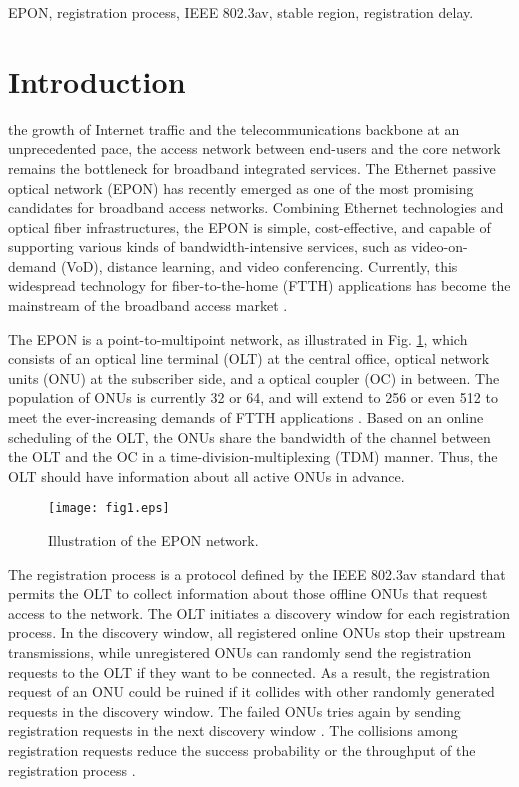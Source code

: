 \documentclass[journal]{IEEEtran}
\begin{document}
\begin{IEEEkeywords}
EPON, registration process, IEEE 802.3av, stable region, registration delay.
\end{IEEEkeywords}

\IEEEpeerreviewmaketitle

\section{Introduction}\label{introduction}
 the growth of Internet traffic and the telecommunications backbone at an unprecedented pace, the access network between end-users and the core network remains the bottleneck for broadband integrated services. The Ethernet passive optical network (EPON) has recently emerged as one of the most promising candidates for broadband access networks. Combining Ethernet technologies and optical fiber infrastructures, the EPON is simple, cost-effective, and capable of supporting various kinds of bandwidth-intensive services, such as video-on-demand (VoD), distance learning, and video conferencing\cite{1kramer2005}. Currently, this widespread technology for fiber-to-the-home (FTTH) applications has become the mainstream of the broadband access market \cite{2kramer2002,3wang2012china,4shinohara2005broadband,5tanaka2010ieee}.

The EPON is a point-to-multipoint network, as illustrated in Fig. \ref{fig1}, which consists of an optical line terminal (OLT) at the central office,  optical network units (ONU) at the subscriber side, and a  optical coupler (OC) in between. The population of ONUs  is currently 32 or 64, and will extend to 256 or even 512 to meet the ever-increasing demands of FTTH applications \cite{6tran2006low,7chan2010remote,8hajduczenia2010ieee}. Based on an online scheduling of the OLT, the ONUs share the bandwidth of the channel between the OLT and the OC in a time-division-multiplexing (TDM) manner. Thus, the OLT should have information about all active ONUs in advance.

\begin{figure}[t]
\centering
\texttt{[image: fig1.eps]}
\caption{Illustration of the EPON network.}\label{fig1}
\end{figure}

The registration process is a protocol defined by the IEEE 802.3av standard \cite{20standard} that permits the OLT to collect information about those offline ONUs that request access to the network. The OLT initiates a discovery window for each registration process. In the discovery window, all registered online ONUs stop their upstream transmissions, while unregistered ONUs can randomly send the registration requests to the OLT if they want to be connected. As a result, the registration request of an ONU could be ruined if it collides with other randomly generated requests in the discovery window. The failed ONUs tries again by sending registration requests in the next discovery window \cite{1kramer2005,10Bjelica}. The collisions among registration requests reduce the success probability or the throughput of the registration process \cite{1kramer2005,9cui2012throughput}.
\end{document}
